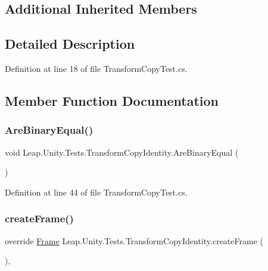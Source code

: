 \subsection*{Additional Inherited Members}


\subsection{Detailed Description}


Definition at line 18 of file Transform\+Copy\+Test.\+cs.



\subsection{Member Function Documentation}
\mbox{\label{class_leap_1_1_unity_1_1_tests_1_1_transform_copy_identity_ab91a7a3434ce825ec1f68f7bd36df0a5}} 
\subsubsection{\texorpdfstring{AreBinaryEqual()}{AreBinaryEqual()}}
{\footnotesize\ttfamily void Leap.\+Unity.\+Tests.\+Transform\+Copy\+Identity.\+Are\+Binary\+Equal (\begin{DoxyParamCaption}{ }\end{DoxyParamCaption})}



Definition at line 44 of file Transform\+Copy\+Test.\+cs.

\mbox{\label{class_leap_1_1_unity_1_1_tests_1_1_transform_copy_identity_aaad557351863e9bcb612237c4a47821f}} 
\subsubsection{\texorpdfstring{createFrame()}{createFrame()}}
{\footnotesize\ttfamily override \mbox{\hyperlink{class_leap_1_1_frame}{Frame}} Leap.\+Unity.\+Tests.\+Transform\+Copy\+Identity.\+create\+Frame (\begin{DoxyParamCaption}{ }\end{DoxyParamCaption})\hspace{0.3cm}{\ttfamily [protected]}, {\ttfamily [virtual]}}



